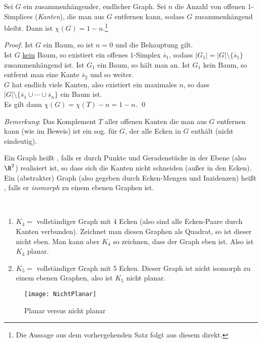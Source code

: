 \begin{theorem}
  Sei \( G \) ein zusammenhängender, endlicher Graph. Sei \( n \) die Anzahl von offenen \( 1 \)-Simplices (\emph{Kanten}), die man aus \( G \) entfernen kann, sodass \( G \) zusammenhängend bleibt. Dann ist \( \chi(G) = 1 - n \).\footnote{Die Aussage aus dem vorhergehenden Satz folgt aus diesem direkt.}
  \begin{proof}
    Ist \( G \) ein Baum, so ist \( n = 0 \) und die Behauptung gilt. \\
    Ist \( G \) \underline{kein} Baum, so existiert ein offenes \( 1 \)-Simplex \( \mathring{s_1} \), sodass \( \vert G_1 \vert = \vert G \vert \setminus \{ \mathring{s_1} \} \) zusammenhängend ist. Ist \( G_1 \) ein Baum, so hält man an. Ist \( G_1 \) kein Baum, so entfernt man eine Kante \( \mathring{s_2} \) und so weiter. \\
    \( G \) hat endlich viele Kanten, also existiert ein maximales \( n \), so dass \( \vert G \vert \setminus \{ \mathring{s_1} \cup \cdots \cup \mathring{s_n} \} \) ein Baum ist. \\
    Es gilt dann \( \chi(G) = \chi(T) - n = 1-n \). \qed{}
  \end{proof}
  \emph{Bemerkung}: Das Komplement \( T \) aller offenen Kanten die man aus \( G \) entfernen kann (wie im Beweis) ist ein sog. \label{def:spannenderBaum} für \( G \), der alle Ecken in \( G \) enthält (nicht eindeutig).
\end{theorem}

\begin{definition}
  Ein Graph heißt \label{def:eben}, falls er durch Punkte und Geradenstücke in der Ebene (also \( \R^2 \)) realisiert ist, so dass sich die Kanten nicht schneiden (außer in den Ecken). \\
  Ein (abstrakter) Graph (also gegeben durch Ecken-Mengen und Inzidenzen) heißt \label{def:planar}, falls er \emph{isomorph} zu einem ebenen Graphen ist.  
\end{definition}

\begin{example}
  \
  \begin{enumerate}
    \item \( K_4 = \) vollständiger Graph mit \( 4 \) Ecken (also sind alle Ecken-Paare durch Kanten verbunden). Zeichnet man diesen Graphen als Quadrat, so ist dieser nicht eben. Man kann aber \( K_4 \) so zeichnen, dass der Graph eben ist. Also ist \( K_4 \) planar.
    \item \( K_5 = \) vollständiger Graph mit \( 5 \) Ecken. Dieser Graph ist nicht isomorph zu einem ebenen Graphen, also ist \( K_5 \) nicht planar.
  \end{enumerate}
  \begin{figure}[H]
    \texttt{[image: NichtPlanar]}
    \caption{Planar versus nicht planar}
  \end{figure}
\end{example}


